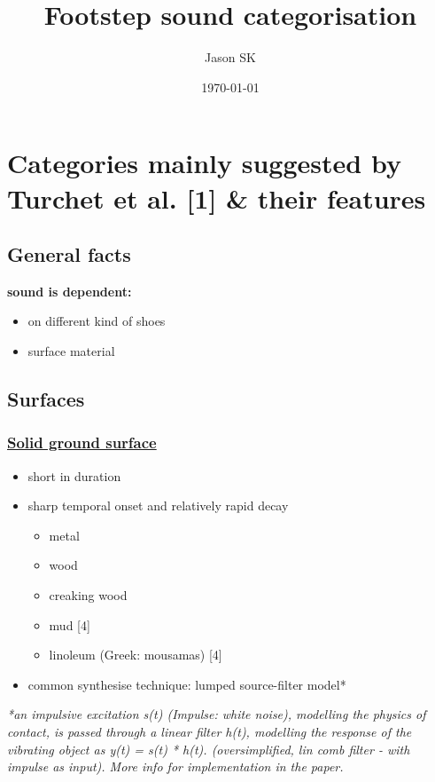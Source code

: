 \documentclass[11pt]{article}
\author{Jason SK}
\date{\today}
\title{Footstep sound categorisation}
\begin{document}
\maketitle
\tableofcontents


\section{Categories mainly suggested by Turchet et al. [1] \& their features}
\label{sec:org6143bb4}


\subsection{General facts}
\label{sec:orgf14e44c}

\textbf{sound is dependent:}
\begin{itemize}
\item on different kind of shoes
\item surface material
\end{itemize}

\subsection{Surfaces}
\label{sec:orgad35c4a}
\subsubsection{\textbf{\underline{Solid ground surface}}}
\label{sec:orgd48f19a}
\begin{itemize}
\item short in duration
\item sharp temporal onset and relatively rapid decay
\begin{itemize}
\item metal
\item wood
\item creaking wood
\item mud [4]
\item linoleum (Greek: mousamas) [4]
\end{itemize}

\item common synthesise technique: lumped source-filter model*
\end{itemize}

\emph{*an impulsive excitation s(t) (Impulse: white noise), modelling the physics of contact, is passed through a linear filter h(t), modelling the response of the vibrating object as y(t) = s(t) * h(t). (oversimplified, lin comb filter - with impulse as input).  More info for implementation in the paper.}
\end{document}
